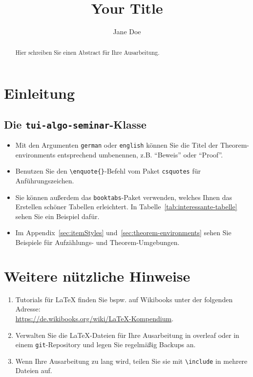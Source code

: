 \documentclass[a4paper,ngerman]{tui-algo-seminar}
\title{Your Title}
\author{Jane Doe}
\begin{document}
\maketitle

\begin{abstract}
Hier schreiben Sie einen Abstract für Ihre Ausarbeitung.
\end{abstract}


\section{Einleitung}

\subsection{Die \texttt{tui-algo-seminar}-Klasse}

\begin{itemize}
	\item Mit den Argumenten \texttt{german} oder \texttt{english} können Sie die Titel der Theorem-environments entsprechend umbenennen, z.B. \enquote{Beweis} oder \enquote{Proof}.
  \item Benutzen Sie den \texttt{\textbackslash enquote\{\}}-Befehl vom Paket \texttt{csquotes} für Anführungszeichen.
  \item Sie können außerdem das \texttt{booktabs}-Paket verwenden,
    welches Ihnen das Erstellen schöner Tabellen erleichtert.
    In Tabelle~\ref{tab:interessante-tabelle} sehen Sie ein Beispiel dafür.
  \item Im Appendix~\ref{sec:itemStyles} und~\ref{sec:theorem-environments} sehen Sie Beispiele für Aufzählungs- und Theorem-Umgebungen.
\end{itemize}

\section{Weitere nützliche Hinweise}
\label{sec:weitere_nutzliche_hinweise}

\begin{enumerate}
  \item Tutorials für \LaTeX{} finden Sie bspw. auf Wikibooks unter der folgenden Adresse: \\ \url{https://de.wikibooks.org/wiki/LaTeX-Kompendium}.
  \item Verwalten Sie die \LaTeX-Dateien für Ihre Ausarbeitung in overleaf oder in einem \texttt{git}-Repository und legen Sie regelmäßig Backups an.
  \item Wenn Ihre Ausarbeitung zu lang wird, teilen Sie sie mit \texttt{\textbackslash include} in mehrere Dateien auf.
\end{enumerate}
\end{document}
